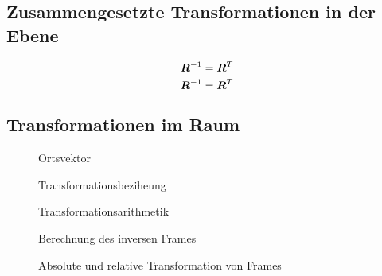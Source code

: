 \subsection{Zusammengesetzte Transformationen in der Ebene}
\label{subsec:transformation_2d}
\begin{equation}
    \boldsymbol{R}^{-1} = \boldsymbol{R}^{T}\label{eq:rotation_2d_b9}
\end{equation}
\begin{equation}
    \boldsymbol{R}^{-1} = \boldsymbol{R}^{T}\label{eq:rotation_2d_b9}
\end{equation}

\subsection{Transformationen im Raum}
\label{subsec:translation_2d}

\begin{figure}[H]
    \centering
    
    \caption{Ortsvektor}\label{fig:trans3d_ortsvektor}
\end{figure}

\begin{figure}[H]
    \centering
    
    \caption{Transformationsbeziheung}\label{fig:trans3d_beziehung}
\end{figure}

\begin{figure}[H]
    \centering
    
    \caption{Transformationsarithmetik}\label{fig:trans3d_arithmetik}
\end{figure}

\begin{figure}[H]
    \centering
    
    \caption{Berechnung des inversen Frames}\label{fig:trans3d_inverse}
\end{figure}

\begin{figure}[H]
    \centering
    
    \caption{Absolute und relative Transformation von Frames}\label{fig:trans3d_absrel}
\end{figure}